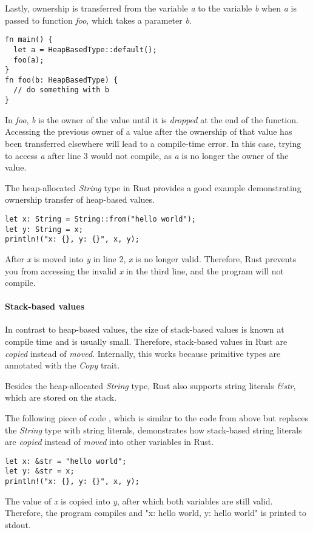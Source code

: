 \documentclass[sigplan,11pt,nonacm]{acmart}
\begin{document}
Lastly, ownership is transferred from the variable \emph{a} to the variable \emph{b} when \emph{a} is passed to function \emph{foo}, which takes a parameter \emph{b}.
\begin{lstlisting}
fn main() {
  let a = HeapBasedType::default();
  foo(a);
}
fn foo(b: HeapBasedType) {
  // do something with b
}
\end{lstlisting}
In \emph{foo}, \emph{b} is the owner of the value until it is \emph{dropped} at the end of the function.
Accessing the previous owner of a value after the ownership of that value has been transferred elsewhere will lead to a compile-time error.
In this case, trying to access \emph{a} after line 3 would not compile, as \emph{a} is no longer the owner of the value.

The heap-allocated \emph{String} type in Rust provides a good example demonstrating ownership transfer of heap-based values.
\begin{lstlisting}
let x: String = String::from("hello world");
let y: String = x;
println!("x: {}, y: {}", x, y);
\end{lstlisting}
After \emph{x} is moved into \emph{y} in line 2, \emph{x} is no longer valid.
Therefore, Rust prevents you from accessing the invalid \emph{x} in the third line, and the program will not compile.


\paragraph{Stack-based values}

In contrast to heap-based values, the size of stack-based values is known at compile time and is usually small.
Therefore, stack-based values in Rust are \emph{copied} instead of \emph{moved}.
Internally, this works because primitive types are annotated with the \emph{Copy} trait.

Besides the heap-allocated \emph{String} type, Rust also supports string literals \emph{\&str}, which are stored on the stack.

The following piece of code \cite{rust-book}, which is similar to the code from above but replaces the \emph{String} type with string literals, demonstrates how stack-based string literals are \emph{copied} instead of \emph{moved} into other variables in Rust.
\begin{lstlisting}
let x: &str = "hello world";
let y: &str = x;
println!("x: {}, y: {}", x, y);
\end{lstlisting}
The value of \emph{x} is copied into \emph{y}, after which both variables are still valid.
Therefore, the program compiles and "x: hello world, y: hello world" is printed to stdout.
\end{document}
